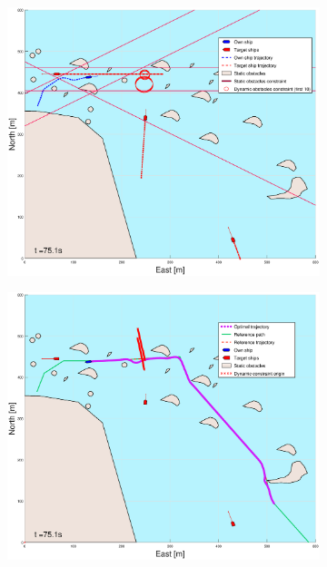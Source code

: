 \begin{figure}[!b]
\begin{subfigure}[b]{0.499\textwidth}
    \end{subfigure}
    \hfill
    \\
    \begin{subfigure}[b]{0.49\textwidth}
        \centering
        \includegraphics[width=\textwidth]{Images/Figures/skjergard_m_trafikk_NEW/_Simple_0fig1_time=75}
    \end{subfigure}
    \hfill
    \begin{subfigure}[b]{0.499\textwidth}
        \centering
        \includegraphics[width=\textwidth]{Images/Figures/skjergard_m_trafikk_NEW/_Simple_0fig999_time=75}
    \end{subfigure}
    \hfill
\end{figure}%
